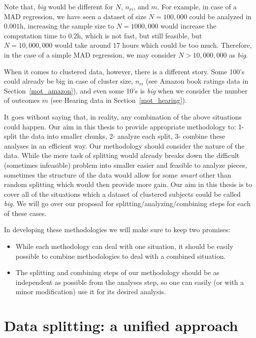\documentclass[11pt,a5paper,twoside]{book}
\begin{document}
Note that, \emph{big} would be different for $N$, $n_{ri}$, and $m$. For example, in case of a MAD regression, we have seen a dataset of size $N=100,000$ could be analyzed in $0.001$h, increasing the sample size to $N = 1000,000$ would increase the computation time to $0.2$h, which is not fast, but still feasible, but $N=10,000,000$ would take around $17$ hours which could be too much. Therefore, in the case of a simple MAD regression, we may consider $N>10,000,000$ as \emph{big}.

When it comes to clustered data, however, there is a different story. Some 100's could already be big in case of cluster size, $n_{ri}$ (see Amazon book ratings data in Section~\ref{mot_amazon}), and even some 10's is \emph{big} when we consider the number of outcomes $m$ (see Hearing data in Section~\ref{mot_hearing}).

It goes without saying that, in reality, any combination of the above situations could happen. Our aim in this thesis to provide appropriate methodology to: 1- split the data into smaller chunks, 2- analyze each split, 3- combine these analyses in an efficient way. Our methodology should consider the nature of the data. While the mere task of splitting would already breaks down the difficult (sometimes infeasible) problem into smaller easier and feasible to analyze pieces, sometimes the structure of the data would allow for some \emph{smart} other than random splitting which would then provide more gain. Our aim in this thesis is to cover all of the situations which a dataset of clustered subjects could be called \emph{big}. We will go over our proposal for splitting/analyzing/combining steps for each of these cases. 

In developing these methodologies we will make sure to keep two promises:

\begin{itemize}
\item While each methodology can deal with one situation, it should be easily possible to combine methodologies to deal with a combined situation.

\item The splitting and combining steps of our methodology should be as independent as possible from the analyses step, so one can easily (or with a minor modification) use it for its desired analysis.
 
\end{itemize}

\section{Data splitting: a unified approach}
\end{document}
